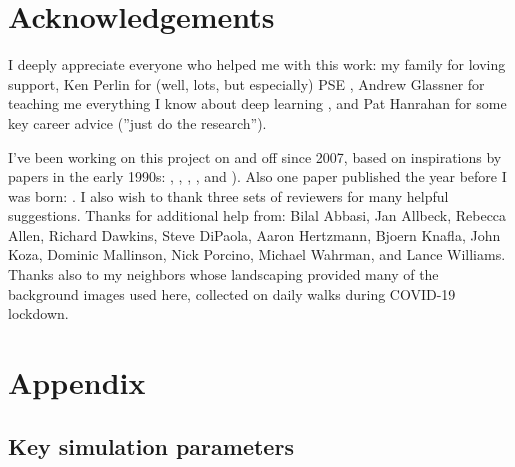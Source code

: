 \documentclass[letterpaper]{article}
\begin{document}


\section{Acknowledgements}
I deeply appreciate everyone who helped me with this work: my family for loving support, Ken Perlin for (well, lots, but especially) PSE \citep{perlin_image_1985}, Andrew Glassner for teaching me everything I know about deep learning \citep{glassner_deep_2021}, and Pat Hanrahan for some key career advice (''just do the research'').
\par
I've been working on this project on and off since 2007, based on inspirations by papers in the early 1990s: \citet{witkin_reaction_1991}, \citet{turk_generating_1991}, \citet{angeline_competitive_1993}, \citet{sims_artificial_1991}, and \citet{sims_evolving_1994}). Also one paper published the year before I was born: \citet{turing_chemical_1952}.
I also wish to thank three sets of reviewers for many helpful suggestions.
Thanks for additional help from:
Bilal Abbasi,
Jan Allbeck,
Rebecca Allen,
Richard Dawkins,
Steve DiPaola,
Aaron Hertzmann,
Bjoern Knafla,
John Koza,
Dominic Mallinson,
Nick Porcino,
Michael Wahrman,
and Lance Williams.
Thanks also to my neighbors whose landscaping provided many of the background images used here, collected on daily walks during COVID-19 lockdown.
\par









\appendix
\onecolumn
\section{Appendix}


\subsection{Key simulation parameters}
\end{document}
